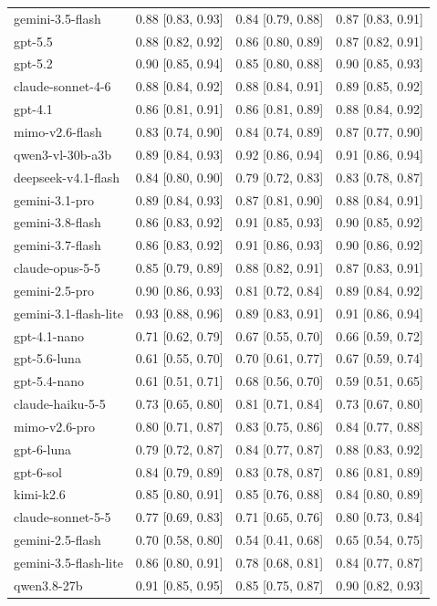 \begin{table}
\begin{tabular}{llll}
gemini-3.5-flash & 0.88 [0.83, 0.93] & 0.84 [0.79, 0.88] & 0.87 [0.83, 0.91] \\
gpt-5.5 & 0.88 [0.82, 0.92] & 0.86 [0.80, 0.89] & 0.87 [0.82, 0.91] \\
gpt-5.2 & 0.90 [0.85, 0.94] & 0.85 [0.80, 0.88] & 0.90 [0.85, 0.93] \\
claude-sonnet-4-6 & 0.88 [0.84, 0.92] & 0.88 [0.84, 0.91] & 0.89 [0.85, 0.92] \\
gpt-4.1 & 0.86 [0.81, 0.91] & 0.86 [0.81, 0.89] & 0.88 [0.84, 0.92] \\
mimo-v2.6-flash & 0.83 [0.74, 0.90] & 0.84 [0.74, 0.89] & 0.87 [0.77, 0.90] \\
qwen3-vl-30b-a3b & 0.89 [0.84, 0.93] & 0.92 [0.86, 0.94] & 0.91 [0.86, 0.94] \\
deepseek-v4.1-flash & 0.84 [0.80, 0.90] & 0.79 [0.72, 0.83] & 0.83 [0.78, 0.87] \\
gemini-3.1-pro & 0.89 [0.84, 0.93] & 0.87 [0.81, 0.90] & 0.88 [0.84, 0.91] \\
gemini-3.8-flash & 0.86 [0.83, 0.92] & 0.91 [0.85, 0.93] & 0.90 [0.85, 0.92] \\
gemini-3.7-flash & 0.86 [0.83, 0.92] & 0.91 [0.86, 0.93] & 0.90 [0.86, 0.92] \\
claude-opus-5-5 & 0.85 [0.79, 0.89] & 0.88 [0.82, 0.91] & 0.87 [0.83, 0.91] \\
gemini-2.5-pro & 0.90 [0.86, 0.93] & 0.81 [0.72, 0.84] & 0.89 [0.84, 0.92] \\
gemini-3.1-flash-lite & 0.93 [0.88, 0.96] & 0.89 [0.83, 0.91] & 0.91 [0.86, 0.94] \\
gpt-4.1-nano & 0.71 [0.62, 0.79] & 0.67 [0.55, 0.70] & 0.66 [0.59, 0.72] \\
gpt-5.6-luna & 0.61 [0.55, 0.70] & 0.70 [0.61, 0.77] & 0.67 [0.59, 0.74] \\
gpt-5.4-nano & 0.61 [0.51, 0.71] & 0.68 [0.56, 0.70] & 0.59 [0.51, 0.65] \\
claude-haiku-5-5 & 0.73 [0.65, 0.80] & 0.81 [0.71, 0.84] & 0.73 [0.67, 0.80] \\
mimo-v2.6-pro & 0.80 [0.71, 0.87] & 0.83 [0.75, 0.86] & 0.84 [0.77, 0.88] \\
gpt-6-luna & 0.79 [0.72, 0.87] & 0.84 [0.77, 0.87] & 0.88 [0.83, 0.92] \\
gpt-6-sol & 0.84 [0.79, 0.89] & 0.83 [0.78, 0.87] & 0.86 [0.81, 0.89] \\
kimi-k2.6 & 0.85 [0.80, 0.91] & 0.85 [0.76, 0.88] & 0.84 [0.80, 0.89] \\
claude-sonnet-5-5 & 0.77 [0.69, 0.83] & 0.71 [0.65, 0.76] & 0.80 [0.73, 0.84] \\
gemini-2.5-flash & 0.70 [0.58, 0.80] & 0.54 [0.41, 0.68] & 0.65 [0.54, 0.75] \\
gemini-3.5-flash-lite & 0.86 [0.80, 0.91] & 0.78 [0.68, 0.81] & 0.84 [0.77, 0.87] \\
qwen3.8-27b & 0.91 [0.85, 0.95] & 0.85 [0.75, 0.87] & 0.90 [0.82, 0.93] \\
\bottomrule
\end{tabular}
\end{table}
